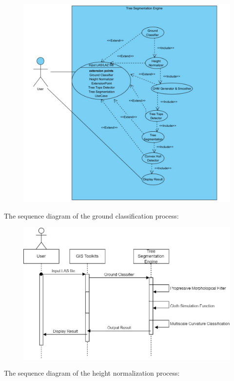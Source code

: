 \documentclass[a4paper, 12pt]{article}
\begin{document}
\begin{figure}[H]
    \centering
    \includegraphics[scale=0.4]{Images/01.jpg}
\end{figure}
\newpage
The sequence diagram of the ground classification process:

\begin{figure}[H]
    \centering
    \includegraphics[scale=0.4]{Images/sequenceDiagram-Ground Classifier.jpg}
\end{figure}

The sequence diagram of the height normalization process:
\end{document}
